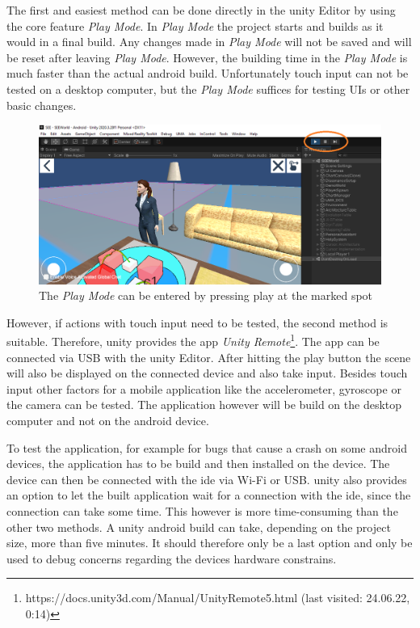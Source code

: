 The first and easiest method can be done directly in the \gls{unity} Editor by using the core feature \textit{Play Mode}.
In \textit{Play Mode} the project starts and builds as it would in a final build.
Any changes made in \textit{Play Mode} will not be saved and will be reset after leaving \textit{Play Mode}.
However, the building time in the \textit{Play Mode} is much faster than the actual \gls{android} build.
Unfortunately touch input can not be tested on a desktop computer, but the \textit{Play Mode} suffices for testing UIs or other basic changes. 

\begin{figure}[htb]
    \centering
    \includegraphics[width=1\textwidth]{Fundamentals/img/play_mode.png}
    \caption{The \textit{Play Mode} can be entered by pressing play at the marked spot}
    \label{fig:play_mode}
\end{figure}

However, if actions with touch input need to be tested, the second method is suitable.
Therefore, \gls{unity} provides the app \textit{Unity Remote}\footnote{https://docs.unity3d.com/Manual/UnityRemote5.html (last visited: 24.06.22, 0:14)}.
The app can be connected via USB with the \gls{unity} Editor.
After hitting the play button the \gls{scene} will also be displayed on the connected device and also take input.
Besides touch input other factors for a mobile application like the accelerometer, gyroscope or the camera can be tested. 
The application however will be build on the desktop computer and not on the \gls{android} device. 

To test the application, for example for bugs that cause a crash on some \gls{android} devices, the application has to be build and then installed on the device.
The device can then be connected with the \gls{ide} via Wi-Fi or USB. 
\gls{unity} also provides an option to let the built application wait for a connection with the \gls{ide}, since the connection can take some time.
This however is more time-consuming than the other two methods. 
A \gls{unity} \gls{android} build can take, depending on the project size, more than five minutes. 
It should therefore only be a last option and only be used to debug concerns regarding the devices hardware constrains. 
